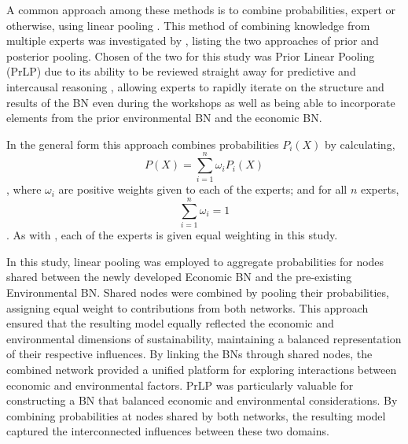 \documentclass{article}
\begin{document}
A common approach among these methods is to combine probabilities, expert or otherwise, using linear pooling \cite{mcconway1981marginalization}. This method of combining knowledge from multiple experts was investigated by \cite{farr2018prior}, listing the two approaches of prior and posterior pooling. Chosen of the two for this study was Prior Linear Pooling (PrLP) due to its ability to be reviewed straight away for predictive and intercausal reasoning \cite{korb2010bayesian}, allowing experts to rapidly iterate on the structure and results of the BN even during the workshops as well as being able to incorporate elements from the prior environmental BN and the economic BN.

In the general form this approach combines probabilities $P_{i}(X)$ by calculating,
$$P(X)=\sum^{n}_{i=1}\omega_{i} P_{i}(X)$$,
where $\omega_{i}$ are positive weights given to each of the experts; and for all $n$ experts,
$$\sum^{n}_{i=1}\omega_{i}=1$$.
As with \cite{farr2018prior}, each of the experts is given equal weighting in this study.

In this study, linear pooling was employed to aggregate probabilities for nodes shared between the newly developed Economic BN and the pre-existing Environmental BN. Shared nodes were combined by pooling their probabilities, assigning equal weight to contributions from both networks. This approach ensured that the resulting model equally reflected the economic and environmental dimensions of sustainability, maintaining a balanced representation of their respective influences. By linking the BNs through shared nodes, the combined network provided a unified platform for exploring interactions between economic and environmental factors. PrLP was particularly valuable for constructing a BN that balanced economic and environmental considerations. By combining probabilities at nodes shared by both networks, the resulting model captured the interconnected influences between these two domains.
\end{document}

